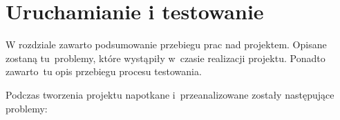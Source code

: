 \section{Uruchamianie i testowanie}
W rozdziale zawarto podsumowanie przebiegu prac nad projektem. Opisane zostaną tu~problemy, które wystąpiły w~czasie realizacji projektu. Ponadto zawarto~tu opis przebiegu procesu testowania.

%
%
%
%
\label{subsec:problemy}
Podczas tworzenia projektu napotkane i~przeanalizowane zostały następujące problemy:
